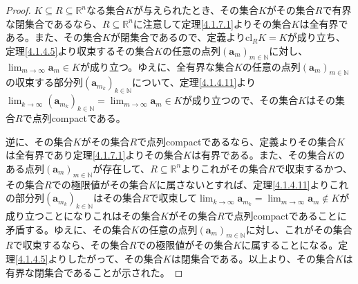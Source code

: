 \documentclass[dvipdfmx]{jsarticle}
\begin{document}
\begin{proof}
$K \subseteq R \subseteq \mathbb{R}^{n}$なる集合$K$が与えられたとき、その集合$K$がその集合$R$で有界な閉集合であるなら、$R \subseteq \mathbb{R}^{n}$に注意して定理\ref{4.1.7.1}よりその集合$K$は全有界である。また、その集合$K$が閉集合であるので、定義より$\mathrm{cl}_{R}K = K$が成り立ち、定理\ref{4.1.4.5}より収束するその集合$K$の任意の点列$\left( \mathbf{a}_{m} \right)_{m \in \mathbb{N}}$に対し、$\lim_{m \rightarrow \infty}\mathbf{a}_{m} \in K$が成り立つ。ゆえに、全有界な集合$K$の任意の点列$\left( \mathbf{a}_{m} \right)_{m \in \mathbb{N}}$の収束する部分列$\left( \mathbf{a}_{m_{k}} \right)_{k \in \mathbb{N}}$について、定理\ref{4.1.4.11}より$\lim_{k \rightarrow \infty}\left( \mathbf{a}_{m_{k}} \right)_{k \in \mathbb{N}} = \lim_{m \rightarrow \infty}\mathbf{a}_{m} \in K$が成り立つので、その集合$K$はその集合$R$で点列compactである。\par
逆に、その集合$K$がその集合$R$で点列compactであるなら、定義よりその集合$K$は全有界であり定理\ref{4.1.7.1}よりその集合$K$は有界である。また、その集合$K$のある点列$\left( \mathbf{a}_{m} \right)_{m \in \mathbb{N}}$が存在して、$R \subseteq \mathbb{R}^{n}$よりこれがその集合$R$で収束するかつ、その集合$R$での極限値がその集合$K$に属さないとすれば、定理\ref{4.1.4.11}よりこれの部分列$\left( \mathbf{a}_{m_{k}} \right)_{k \in \mathbb{N}}$はその集合$R$で収束して$\lim_{k \rightarrow \infty}\mathbf{a}_{m_{k}} = \lim_{m \rightarrow \infty}\mathbf{a}_{m} \notin K$が成り立つことになりこれはその集合$K$がその集合$R$で点列compactであることに矛盾する。ゆえに、その集合$K$の任意の点列$\left( \mathbf{a}_{m} \right)_{m \in \mathbb{N}}$に対し、これがその集合$R$で収束するなら、その集合$R$での極限値がその集合$K$に属することになる。定理\ref{4.1.4.5}よりしたがって、その集合$K$は閉集合である。以上より、その集合$K$は有界な閉集合であることが示された。
\end{proof}
\end{document}
